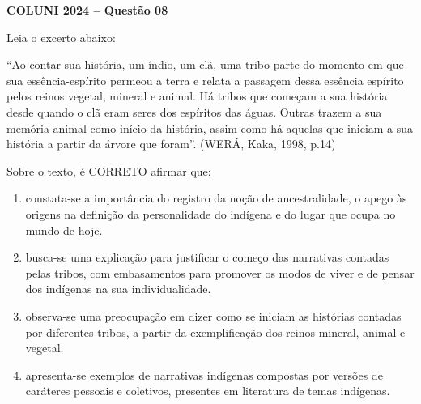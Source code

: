 \textbf{COLUNI 2024 -- Questão 08}\par\medskip Leia o excerto abaixo:

\par

“Ao contar sua história, um índio, um clã, uma tribo parte do momento em que sua essência-espírito permeou a terra e relata a passagem dessa essência espírito pelos reinos vegetal, mineral e animal. Há tribos que começam a sua história desde quando o clã eram seres dos espíritos das águas. Outras trazem a sua memória animal como início da história, assim como há aquelas que iniciam a sua história a partir da árvore que foram”. (WERÁ, Kaka, 1998, p.14)

\par

Sobre o texto, é CORRETO afirmar que:\begin{enumerate}
\item constata-se a importância do registro da noção de ancestralidade, o apego às origens na definição da
      personalidade do indígena e do lugar que ocupa no mundo de hoje.
\item busca-se uma explicação para justificar o começo das narrativas contadas pelas tribos, com
      embasamentos para promover os modos de viver e de pensar dos indígenas na sua individualidade.
\item observa-se uma preocupação em dizer como se iniciam as histórias contadas por diferentes tribos, a partir
      da exemplificação dos reinos mineral, animal e vegetal.
\item apresenta-se exemplos de narrativas indígenas compostas por versões de caráteres pessoais e coletivos,
      presentes em literatura de temas indígenas.\end{enumerate}
